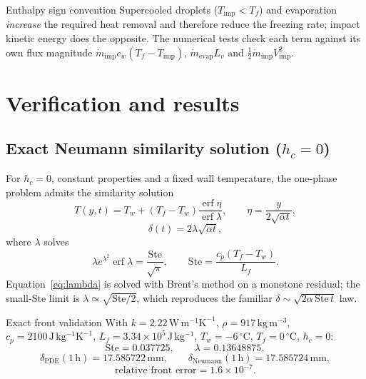 \documentclass[11pt,a4paper]{article}
\newcommand{\Tw}{T_w}
\newcommand{\Tf}{T_f}
\newcommand{\Timp}{T_{\mathrm{imp}}}
\newcommand{\Lf}{L_f}
\newcommand{\mdot}{\dot m}
\begin{document}
\begin{insightbox}{Enthalpy sign convention}
Supercooled droplets ($\Timp<\Tf$) and evaporation \emph{increase} the required heat
removal and therefore reduce the freezing rate; impact kinetic energy does the opposite.
The numerical tests check each term against its own flux magnitude
$\mdot_{\mathrm{imp}}c_w(\Tf-\Timp)$, $\mdot_{\mathrm{evap}}L_v$ and
$\tfrac12\mdot_{\mathrm{imp}}V_{\mathrm{imp}}^2$.
\end{insightbox}

\section{Verification and results}\label{sec:verify}

\subsection{Exact Neumann similarity solution ($h_c=0$)}

For $h_c=0$, constant properties and a fixed wall temperature, the one-phase problem
admits the similarity solution
\begin{equation}\label{eq:neumannT}
  T(y,t)=\Tw+(\Tf-\Tw)\frac{\operatorname{erf}\eta}{\operatorname{erf}\lambda},
  \qquad
  \eta=\frac{y}{2\sqrt{\alpha t}},
\end{equation}
\begin{equation}\label{eq:neumannfront}
  \delta(t)=2\lambda\sqrt{\alpha t},
\end{equation}
where $\lambda$ solves
\begin{equation}\label{eq:lambda}
  \boxed{\;\lambda e^{\lambda^2}\operatorname{erf}\lambda
  =\frac{\mathrm{Ste}}{\sqrt\pi},\qquad
  \mathrm{Ste}=\frac{c_p(\Tf-\Tw)}{\Lf}.\;}
\end{equation}
Equation~\eqref{eq:lambda} is solved with Brent's method on a monotone residual; the
small-$\mathrm{Ste}$ limit is $\lambda\simeq\sqrt{\mathrm{Ste}/2}$, which reproduces the
familiar $\delta\sim\sqrt{2\alpha\,\mathrm{Ste}\,t}$ law.

\begin{resultbox}{Exact front validation}
With $k=2.22\,\mathrm{W\,m^{-1}K^{-1}}$, $\rho=917\,\mathrm{kg\,m^{-3}}$,
$c_p=2100\,\mathrm{J\,kg^{-1}K^{-1}}$, $\Lf=3.34\times10^{5}\,\mathrm{J\,kg^{-1}}$,
$\Tw=-6\,^\circ\mathrm{C}$, $\Tf=0\,^\circ\mathrm{C}$, $h_c=0$:
\[
  \mathrm{Ste}=0.037725,\qquad \lambda=0.13648875,
\]
\[
  \delta_{\mathrm{PDE}}(1\,\mathrm{h})=17.585722\,\mathrm{mm},\qquad
  \delta_{\mathrm{Neumann}}(1\,\mathrm{h})=17.585724\,\mathrm{mm},
\]
\[
  \text{relative front error}=1.6\times10^{-7}.
\]
\end{resultbox}
\end{document}
